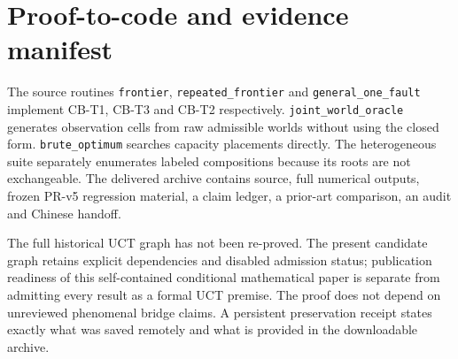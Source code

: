 \section{Proof-to-code and evidence manifest}
The source routines \texttt{frontier}, \texttt{repeated\_frontier} and \texttt{general\_one\_fault} implement CB-T1, CB-T3 and CB-T2 respectively. \texttt{joint\_world\_oracle} generates observation cells from raw admissible worlds without using the closed form. \texttt{brute\_optimum} searches capacity placements directly. The heterogeneous suite separately enumerates labeled compositions because its roots are not exchangeable. The delivered archive contains source, full numerical outputs, frozen PR-v5 regression material, a claim ledger, a prior-art comparison, an audit and Chinese handoff.

The full historical UCT graph has not been re-proved. The present candidate graph retains explicit dependencies and disabled admission status; publication readiness of this self-contained conditional mathematical paper is separate from admitting every result as a formal UCT premise. The proof does not depend on unreviewed phenomenal bridge claims. A persistent preservation receipt states exactly what was saved remotely and what is provided in the downloadable archive.

